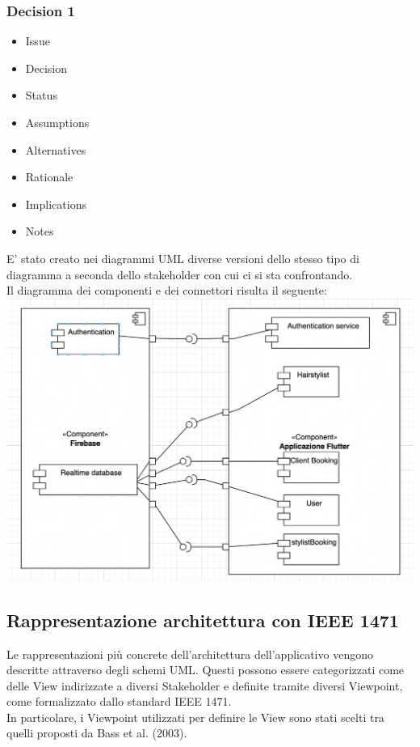 \documentclass{article}
\begin{document}
\subsubsection{Decision 1}
\begin{itemize}
\item Issue 
\item Decision
\item Status 
\item Assumptions
\item Alternatives
\item Rationale
\item Implications    
\item Notes
\end{itemize}
E' stato creato nei diagrammi UML diverse versioni dello stesso tipo di diagramma a seconda dello stakeholder
con cui ci si sta confrontando.
\\Il diagramma dei componenti e dei connettori risulta il seguente:
\\\includegraphics[scale = 0.45]{"Immagini/SoftArch.png"}

\subsection{Rappresentazione architettura con IEEE 1471} 
Le rappresentazioni più concrete dell'architettura dell'applicativo vengono descritte attraverso degli schemi UML. Questi possono essere categorizzati come delle View indirizzate a diversi Stakeholder e definite tramite diversi Viewpoint, come formalizzato dallo standard IEEE 1471.
\\In particolare, i Viewpoint utilizzati per definire le View sono stati scelti tra quelli proposti da Bass et al. (2003).
\end{document}
